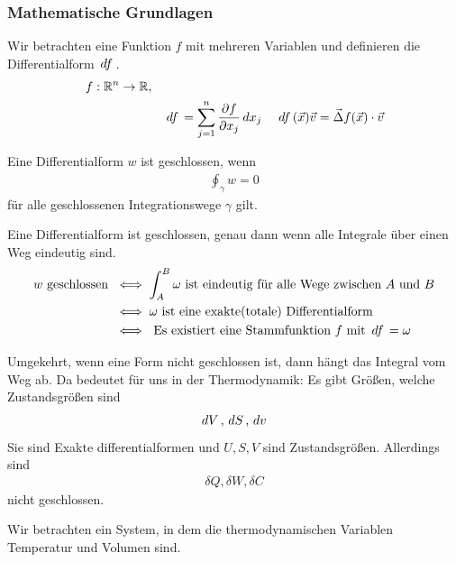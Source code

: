 \subsubsection*{Mathematische Grundlagen}
Wir betrachten eine Funktion $f$ mit mehreren Variablen und definieren 
die Differentialform $\,df\,$.
%
\begin{align*}
  f: \mathbb{R}^n \to \mathbb{R}, &&   \\
                  && \,df\, = \sum_{j=1}^{n} \frac{\partial f }{\partial x_j} \,dx_j\, \quad 
  \,df\,(\vec{x})\vec{v}  = \vec{\Delta} f(\vec{x}) \cdot \vec{v}
\end{align*}
%
\begin{definition}
  Eine Differentialform $w$ ist geschlossen, wenn
  \begin{align*}
    \oint_{\gamma}^{} w = 0  \end{align*}
    f\"ur alle geschlossenen Integrationswege $\gamma$ gilt.
\end{definition}
\begin{theorem*}
  Eine Differentialform ist geschlossen, genau dann wenn alle Integrale
  über einen Weg eindeutig sind.
  \begin{align*}
    w \text{ geschlossen } &  \iff \int_{A}^{B} \omega \text{ ist eindeutig f\"ur
    alle Wege zwischen $A$ und $B$} \\
    & \iff \omega \text{ ist eine exakte(totale) Differentialform} \\
    & \iff \text{ Es existiert eine Stammfunktion $f$ mit $ \,df\, = \omega$}
  \end{align*}
\end{theorem*}
  Umgekehrt, wenn eine Form nicht geschlossen ist, dann h\"angt das Integral vom Weg ab.
  Da bedeutet f\"ur uns in der Thermodynamik:
  Es gibt Gr\"o\ss{}en, welche Zustandsgr\"o\ss{}en sind
  \begin{align*}
    \,dV\,, \,dS\,, \,dv\,
  \end{align*}
  Sie sind Exakte differentialformen und $U, S, V$ sind Zustandsgr\"o\ss{}en.
  Allerdings sind
  \begin{align*}
    \delta Q, \delta W, \delta C
  \end{align*}
  nicht geschlossen.

  Wir betrachten ein System, in dem die thermodynamischen Variablen 
  Temperatur und Volumen sind.

